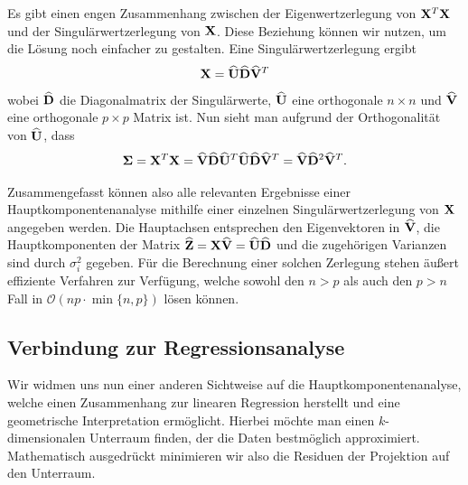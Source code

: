 Es gibt einen engen Zusammenhang zwischen der Eigenwertzerlegung von $\mathbf{X}^T \mathbf{X}$ und der Singulärwertzerlegung von $\mathbf{X}$. Diese Beziehung können wir nutzen, um die Lösung noch einfacher zu gestalten. Eine Singulärwertzerlegung ergibt
$$\mathbf{X} = \widehat{\mathbf{U}}\widehat{\mathbf{D}}\widehat{\mathbf{V}}^T$$
wobei $\widehat{\mathbf{D}}$ die Diagonalmatrix der Singulärwerte, $\widehat{\mathbf{U}}$ eine orthogonale $n \times n$ und $\widehat{\mathbf{V}}$ eine orthogonale $p \times p$ Matrix ist. Nun sieht man aufgrund der Orthogonalität von $\widehat{\mathbf{U}}$, dass
$$\mathbf{\Sigma} = \mathbf{X}^T \mathbf{X} = \widehat{\mathbf{V}}\widehat{\mathbf{D}}\widehat{\mathbf{U}}^T \widehat{\mathbf{U}}\widehat{\mathbf{D}}\widehat{\mathbf{V}}^T = \widehat{\mathbf{V}} \widehat{\mathbf{D}}^2 \widehat{\mathbf{V}}^T.$$

Zusammengefasst können also alle relevanten Ergebnisse einer Hauptkomponentenanalyse mithilfe einer einzelnen Singulärwertzerlegung von $\mathbf{X}$ angegeben werden. Die Hauptachsen entsprechen den Eigenvektoren in $\widehat{\mathbf{V}}$, die Hauptkomponenten der Matrix $\widehat{\mathbf{Z}} = \mathbf{X} \widehat{\mathbf{V}} = \widehat{\mathbf{U}} \widehat{\mathbf{D}}$ und die zugehörigen Varianzen sind durch $\sigma_i^2$ gegeben. Für die Berechnung einer solchen Zerlegung stehen äußert effiziente Verfahren zur Verfügung, welche sowohl den $n>p$ als auch den $p>n$ Fall in $\mathcal{O}(np \cdot \min\{n,p\})$ lösen können. 

\subsection{Verbindung zur Regressionsanalyse}

Wir widmen uns nun einer anderen Sichtweise auf die Hauptkomponentenanalyse, welche einen Zusammenhang zur linearen Regression herstellt und eine geometrische Interpretation ermöglicht. Hierbei möchte man einen $k$-dimensionalen Unterraum finden, der die Daten bestmöglich approximiert. Mathematisch ausgedrückt minimieren wir also die Residuen der Projektion auf den Unterraum.

